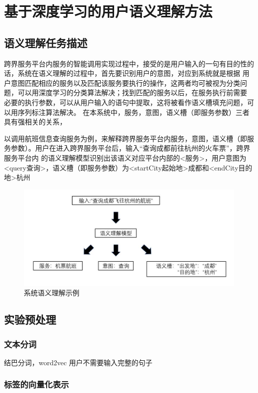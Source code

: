 \chapter{基于深度学习的用户语义理解方法}

\section{语义理解任务描述}
跨界服务平台内服务的智能调用实现过程中，接受的是用户输入的一句有目的性的话，系统在语义理解的过程中，首先要识别用户的意图，对应到系统就是根据
用户意图匹配相应的服务以及匹配该服务要执行的操作，这两者均可被视为分类问题，可以用深度学习的分类算法解决；找到匹配的服务以后，在服务执行前需要
必要的执行参数，可以从用户输入的语句中提取，这将被看作语义槽填充问题，可以用序列标注算法解决。
在本系统中，服务，意图，语义槽（即服务参数）三者具有强相关的关系，

以调用航班信息查询服务为例，来解释跨界服务平台内服务，意图，语义槽（即服务参数）。用户在进入跨界服务平台后，输入“查询成都前往杭州的火车票”，跨界服务平台内
的语义理解模型识别出该语义对应平台内部的<服务>，用户意图为<query查询>，语义槽（即服务参数）为<startCity起始地>成都和<endCity目的地>杭州


\begin{figure}[htbp]
    \centering
    \includegraphics[scale=0.5]{./images/questiondesc.jpg}
    \caption{系统语义理解示例}
    \label{fig:questiondesc}
  \end{figure}


\section{实验预处理}
\subsection{文本分词}
结巴分词，word2vec
用户不需要输入完整的句子

\subsection{标签的向量化表示}

